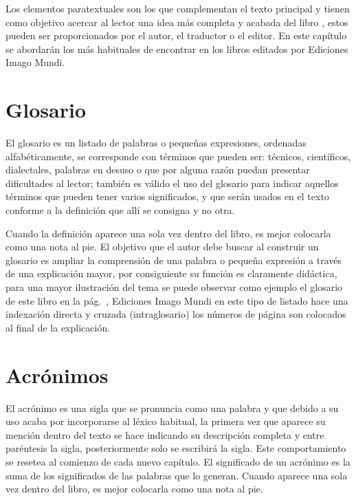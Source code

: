 \documentclass{book}
\begin{document}
{{{{{{{{{{{{{{{{{\noindent Los elementos paratextuales son los que complementan el texto principal y tienen como objetivo acercar al lector una idea más completa y acabada del libro \parencite{GarciaNegroni2006}, estos pueden ser proporcionados por el autor, el traductor o el editor. En este capítulo se abordarán los más habituales de encontrar en los libros editados por Ediciones Imago Mundi.

\section{Glosario \label{ind-glos}}

El glosario es un listado de palabras o pequeñas expresiones, ordenadas alfabéticamente, se corresponde con términos que pueden ser: técnicos, científicos, dialectales, palabras en desuso o que por alguna razón puedan presentar dificultades al lector; también es válido el uso del glosario para indicar aquellos términos que pueden tener varios significados, y que serán usados en el texto conforme a la definición que allí se consigna y no otra.

Cuando la definición aparece una sola vez dentro del libro, es mejor colocarla como una nota al pie. El objetivo que el autor debe buscar al construir un glosario es ampliar la comprensión de una palabra o pequeña expresión a través de una explicación mayor, por consiguiente su función es claramente didáctica, para una mayor ilustración del tema se puede observar como ejemplo el glosario de este libro en la pág.~\pageref{comienzo-glosario}, Ediciones Imago Mundi en este tipo de listado hace una indexación directa y cruzada (intraglosario) los números de página son colocados al final de la explicación.

\section{Acrónimos \label{acronim}}

El acrónimo es una sigla que se pronuncia como una palabra y que debido a su uso acaba por incorporarse al léxico habitual, la primera vez que aparece su mención dentro del texto se hace indicando su descripción completa y entre paréntesis la sigla, posteriormente solo se escribirá la sigla. Este comportamiento se resetea al comienzo de cada nuevo capítulo. El significado de un acrónimo es la suma de los significados de las palabras que lo generan. Cuando aparece una sola vez dentro del libro, es mejor colocarla como una nota al pie.

}}}}}}}}}}}}}}}}}
\end{document}

